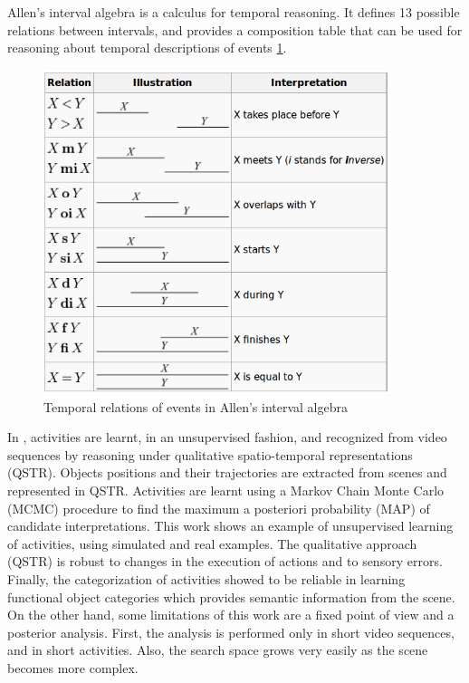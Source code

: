 Allen's interval algebra is a calculus for temporal reasoning.
It defines 13 possible relations between intervals, and provides a composition table that can be used for reasoning about temporal descriptions of events \ref{fig:allen}.

\begin{figure}[h]
\centering
\includegraphics[width=4in]{fig/allen_interval.png}
\caption{Temporal relations of events in Allen's interval algebra}
\label{fig:allen}
\end{figure}


In \citep{Sridhar10_PhD_UnsupervisedLearningEvent}, activities are learnt, in an unsupervised fashion, and recognized from video sequences by reasoning under qualitative spatio-temporal representations (QSTR). 
Objects positions and their trajectories are extracted from scenes and represented in QSTR.
Activities are learnt using a Markov Chain Monte Carlo (MCMC) procedure to find the maximum a posteriori probability (MAP) of candidate interpretations.
This work shows an example of unsupervised learning of activities, using simulated and real examples.
The qualitative approach (QSTR) is robust to changes in the execution of actions and to sensory errors.
Finally, the categorization of activities showed to be reliable in learning functional object categories which provides semantic information from the scene.
On the other hand, some limitations of this work are a fixed point of view and a posterior analysis.
First, the analysis is performed only in short video sequences, and in short activities.
Also, the search space grows very easily as the scene becomes more complex.

